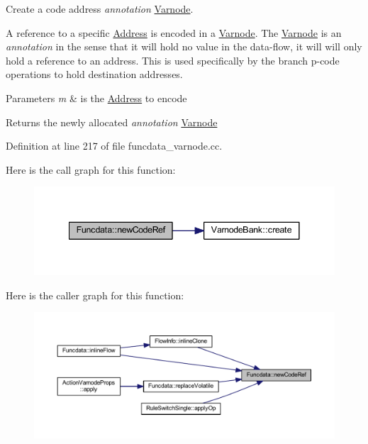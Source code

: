 Create a code address {\itshape annotation} \mbox{\hyperlink{class_varnode}{Varnode}}. 

A reference to a specific \mbox{\hyperlink{class_address}{Address}} is encoded in a \mbox{\hyperlink{class_varnode}{Varnode}}. The \mbox{\hyperlink{class_varnode}{Varnode}} is an {\itshape annotation} in the sense that it will hold no value in the data-\/flow, it will will only hold a reference to an address. This is used specifically by the branch p-\/code operations to hold destination addresses. 
\begin{DoxyParams}{Parameters}
{\em m} & is the \mbox{\hyperlink{class_address}{Address}} to encode \\
\hline
\end{DoxyParams}
\begin{DoxyReturn}{Returns}
the newly allocated {\itshape annotation} \mbox{\hyperlink{class_varnode}{Varnode}} 
\end{DoxyReturn}


Definition at line 217 of file funcdata\+\_\+varnode.\+cc.

Here is the call graph for this function\+:
\nopagebreak
\begin{figure}[H]
\begin{center}
\leavevmode
\includegraphics[width=341pt]{class_funcdata_a24e80f56ef371a0010a9e67ae8510086_cgraph}
\end{center}
\end{figure}
Here is the caller graph for this function\+:
\nopagebreak
\begin{figure}[H]
\begin{center}
\leavevmode
\includegraphics[width=350pt]{class_funcdata_a24e80f56ef371a0010a9e67ae8510086_icgraph}
\end{center}
\end{figure}
\mbox{\label{class_funcdata_af58542dbcc89f4b84ffc8834b023125b}} 
